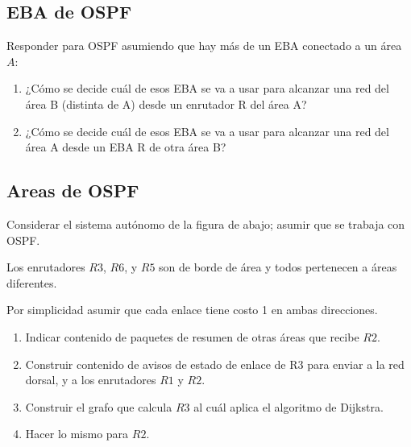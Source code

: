 \documentclass[12pt]{report}
\begin{document}
\begin{exer}
\subsection{EBA de OSPF \sthree \steo}
Responder para OSPF asumiendo que hay más de un EBA conectado a un área $A$:
\begin{enumerate}
\item ¿Cómo se decide cuál de esos EBA se va a usar para alcanzar una red del área B (distinta de A)
desde un enrutador R del área A?
\item ¿Cómo se decide cuál de esos EBA se va a usar para alcanzar una red del área A desde un EBA
R de otra área B?
\end{enumerate}
\end{exer}

\begin{exer}
\subsection{Areas de OSPF \sfour}
Considerar el sistema autónomo de la figura de abajo; asumir que se trabaja con OSPF.

Los enrutadores $R3$, $R6$, y $R5$ son de borde de área y todos pertenecen a áreas diferentes.

Por simplicidad asumir que cada enlace tiene costo 1 en ambas direcciones.


\begin{enumerate}
\item Indicar contenido de paquetes de resumen de otras áreas que recibe $R2$.
\item Construir contenido de avisos de estado de enlace de R3 para enviar a la red dorsal, y a los
enrutadores $R1$ y $R2$.
\item Construir el grafo que calcula $R3$ al cuál aplica el algoritmo de Dijkstra.
\item Hacer lo mismo para $R2$.
\end{enumerate}
\end{exer}
\end{document}
